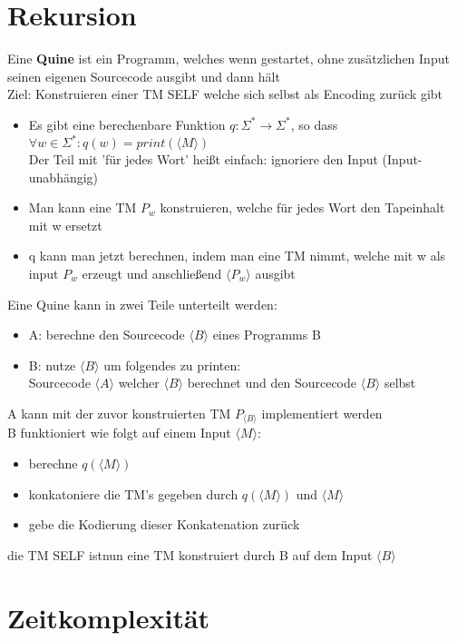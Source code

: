\documentclass[12pt,a4paper]{article}
\begin{document}
\section{Rekursion}
Eine \textbf{Quine} ist ein Programm, welches wenn gestartet, ohne zusätzlichen Input seinen eigenen Sourcecode ausgibt und dann hält\\
Ziel: Konstruieren einer TM SELF welche sich selbst als Encoding zurück gibt
\begin{itemize}
\item Es gibt eine berechenbare Funktion $q: \Sigma^* \rightarrow \Sigma^*$, so dass $\forall w \in \Sigma^* : q(w) = print (\langle M \rangle)$\\
Der Teil mit 'für jedes Wort' heißt einfach: ignoriere den Input (Input-unabhängig)
\item Man kann eine TM $P_w$ konstruieren, welche für jedes Wort den Tapeinhalt mit w ersetzt
\item q kann man jetzt berechnen, indem man eine TM nimmt, welche mit w als input $P_w$ erzeugt und anschließend $\langle P_w \rangle$ ausgibt
\end{itemize}
Eine Quine kann in zwei Teile unterteilt werden:
\begin{itemize}
\item A: berechne den Sourcecode $\langle B \rangle$ eines Programms B
\item B: nutze $\langle B \rangle$ um folgendes zu printen:\\
Sourcecode $\langle A \rangle$ welcher $\langle B \rangle$ berechnet und den Sourcecode $\langle B \rangle$ selbst
\end{itemize}
A kann mit der zuvor konstruierten TM $P_{\langle B \rangle}$ implementiert werden\\
B funktioniert wie folgt auf einem Input $\langle M \rangle$:
\begin{itemize}
\item berechne $q(\langle M \rangle)$
\item konkatoniere die TM's gegeben durch $q(\langle M \rangle)$ und $\langle M \rangle$
\item gebe die Kodierung dieser Konkatenation zurück
\end{itemize}
die TM SELF istnun eine TM konstruiert durch B auf dem Input $\langle B \rangle$

\section{Zeitkomplexität}
\end{document}
